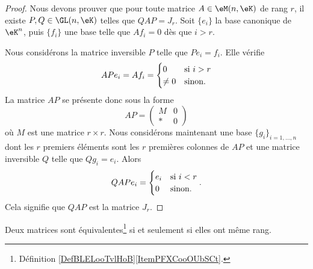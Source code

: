 \begin{proof}
    Nous devons prouver que pour toute matrice \( A\in\eM(n,\eK)\) de rang \( r\), il existe \( P,Q\in\GL(n,\eK)\) telles que \(QAP=J_r\). Soit \( \{ e_i \}\) la base canonique de \( \eK^n\), puis \( \{ f_i \}\) une base telle que \( Af_i=0\) dès que \( i>r\).

    Nous considérons la matrice inversible \( P\) telle que \( Pe_i=f_i\). Elle vérifie
    \begin{equation}
        APe_i=Af_i=\begin{cases}
            0    &   \text{si \( i>r\)}\\
            \neq 0    &    \text{sinon}.
        \end{cases}
    \end{equation}
    La matrice \( AP\) se présente donc sous la forme
    \begin{equation}
        AP=\begin{pmatrix}
            M    &   0    \\ 
            *    &   0    
        \end{pmatrix}
    \end{equation}
    où \( M\) est une matrice \( r\times r\). Nous considérons maintenant une base \( \{ g_i \}_{i=1,\ldots, n}\) dont les \( r\) premiers éléments sont les \( r\) premières colonnes de \( AP\) et une matrice inversible \( Q\) telle que \( Qg_i=e_i\). Alors
    \begin{equation}
        QAPe_i=\begin{cases}
            e_i    &   \text{si \( i<r\)}\\
            0    &    \text{sinon}.
        \end{cases}.
    \end{equation}
    Cela signifie que \( QAP\) est la matrice \( J_r\).
\end{proof}

\begin{corollary}      \label{CorGOUYooErfOIe}
    Deux matrices sont équivalentes\footnote{Définition \ref{DefBLELooTvlHoB}\ref{ItemPFXCooOUbSCt}.} si et seulement si elles ont même rang.
\end{corollary}

